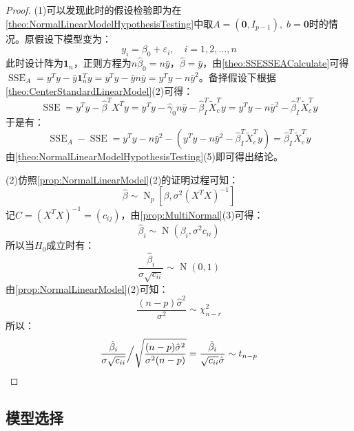 \begin{proof}
	(1)可以发现此时的假设检验即为在\cref{theo:NormalLinearModelHypothesisTesting}中取$A=(\mathbf{0},I_{p-1}),\;b=\mathbf{0}$时的情况。原假设下模型变为：
	\begin{equation*}
		y_i=\beta_0+\varepsilon_i,\quad i=1,2,\dots,n
	\end{equation*}
	此时设计阵为$\mathbf{1}_n$，正则方程为$n\hat{\beta}_0=n\bar{y}$，$\hat{\beta}=\bar{y}$，由\cref{theo:SSESSEACalculate}可得$\operatorname{SSE}_A=y^Ty-\bar{y}\mathbf{1}_n^Ty=y^Ty-\bar{y}n\bar{y}=y^Ty-n\bar{y}^2$。备择假设下根据\cref{theo:CenterStandardLinearModel}(2)可得：
	\begin{equation*}
		\operatorname{SSE}=y^Ty-\hat{\beta}^TX^Ty=y^Ty-\hat{\gamma}_0n\bar{y}-\hat{\beta}_I^T\tilde{X}_c^Ty=y^Ty-n\bar{y}^2-\hat{\beta}_I^T\tilde{X}_c^Ty
	\end{equation*}
	于是有：
	\begin{equation*}
		\operatorname{SSE}_A-\operatorname{SSE}=y^Ty-n\bar{y}^2-(y^Ty-n\bar{y}^2-\hat{\beta}_I^T\tilde{X}_c^Ty)=\hat{\beta}_I^T\tilde{X}_c^Ty
	\end{equation*}
	由\cref{theo:NormalLinearModelHypothesisTesting}(5)即可得出结论。\par
	(2)仿照\cref{prop:NormalLinearModel}(2)的证明过程可知：
	\begin{equation*}
		\hat{\beta}\sim\operatorname{N}_p[\beta,\sigma^2(X^TX)^{-1}]
	\end{equation*}
	记$C=(X^TX)^{-1}=(c_{ij})$，由\cref{prop:MultiNormal}(3)可得：
	\begin{equation*}
		\hat{\beta}_i\sim\operatorname{N}(\beta_i,\sigma^2c_{ii})
	\end{equation*}
	所以当$H_0$成立时有：
	\begin{equation*}
		\frac{\hat{\beta}_i}{\sigma\sqrt{c_{ii}}}\sim\operatorname{N}(0,1)
	\end{equation*}
	由\cref{prop:NormalLinearModel}(2)可知：
	\begin{equation*}
		\frac{(n-p)\hat{\sigma}^2}{\sigma^2}\sim\chi_{n-r}^2
	\end{equation*}
	所以：
	\begin{equation*}
		\frac{\hat{\beta}_i}{\sigma\sqrt{c_{ii}}}\Big/\sqrt{\frac{(n-p)\hat{\sigma}^2}{\sigma^2(n-p)}}=\frac{\hat{\beta}_i}{\sqrt{c_{ii}}\hat{\sigma}}\sim t_{n-p}\qedhere
	\end{equation*}
\end{proof}

\subsection{模型选择}
